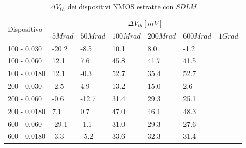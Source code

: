 \documentclass[
	a4paper,
	cleardoublepage=empty,
	headings=twolinechapter,
	numbers=autoenddot,
]{scrbook}
\begin{document}
\begin{table}[H]
  \renewcommand{\arraystretch}{1.3}
  \begin{tabular}{m{2.1cm}  m{1.1cm} m{1.3cm} m{1.5cm} m{1.5cm} m{1.5cm} m{1cm}}
    \toprule
    \multirow{2}{*}{Dispositivo} & \multicolumn{6}{c}{$\Delta V_{th} [mV] $}                                                          \\
    \cmidrule{2-7}
                                 & $5Mrad$                                   & $50Mrad$ & $100Mrad$ & $200Mrad$ & $600Mrad$ & $1Grad$ \\
    \midrule
    100 - 0.030                     & -20.2                                     & -8.5     & 10.1      & 8.0       & -1.2      &         \\
    \hline
    100 - 0.060                     & 12.1                                      & 7.6      & 45.8      & 41.7      & 41.5      &         \\
    \hline
    100 - 0.0180                    & 12.1                                      & -0.3     & 52.7      & 35.4      & 52.7      &         \\
    \hline
    200 - 0.030                     & -2.5                                      & 4.9      & 13.2      & 15.0      & 2.6       &         \\
    \hline
    200 - 0.060                     & -0.6                                      & -12.7    & 31.4      & 29.3      & 25.1      &         \\
    \hline
    200 - 0.0180                    & 7.1                                       & 0.7      & 47.0      & 46.1      & 48.3      &         \\
    \hline
    600 - 0.060                     & -29.1                                     & -1.1     & 31.0      & 29.3      & 27.6      &         \\
    \hline
    600 - 0.0180                    & -3.3                                      & --5.2    & 33.6      & 32.3      & 31.4      &         \\
    \bottomrule
  \end{tabular}
  \caption{$\Delta V_{th}$ dei dispositivi NMOS estratte con \emph{SDLM}}
  \label{tab:deltaVthSDLMN}
\end{table}
\end{document}
